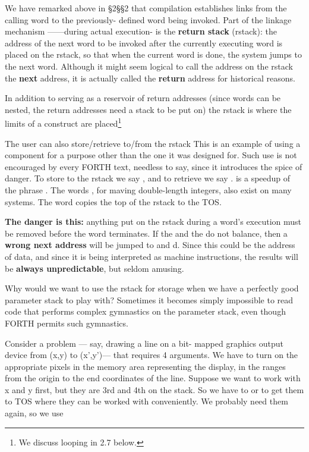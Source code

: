 We have remarked above in §2§§2 that compilation establishes links from the calling word to the previously- defined word being invoked. Part of the linkage mechanism ——during actual execution- is the \textbf{return stack} (rstack): the address of the next word to be invoked after the currently executing word is placed on the rstack, so that when the current word is done, the system jumps to the next word. Although it might seem logical to call the address on the rstack the \textbf{next} address, it is actually called the \textbf{return} address for historical reasons.

In addition to serving as a reservoir of return addresses (since words can be nested, the return addresses need a stack to be put on) the rstack is where the limits of a  construct are placed\footnote{We discuss looping in 2.7 below.}

The user can also store/retrieve to/from the rstack This is an example of using a component for a purpose other than the one it was designed for. Such use is not encouraged by every FORTH text, needless to say, since it introduces the spice of danger. To store to the rstack we say , and to retrieve we say .  is a speedup of the phrase . The words  , for maving double-length integers, also exist on many systems. The word  copies the top of the rstack to the TOS.

\leftbar[1\linewidth]
\textbf{The danger is this:} anything put on the rstack during a word’s execution must be removed before the word terminates. If the  and the  do not balance, then a \textbf{wrong next address} will be jumped to and d. Since this could be the address of data, and since it is being interpreted as machine instructions, the results will be \textbf{always unpredictable}, but seldom amusing.
\endleftbar

Why would we want to use the rstack for storage when we have a perfectly good parameter stack to play with? Sometimes it becomes simply impossible to read code that performs complex gymnastics on the parameter stack, even though FORTH permits such gymnastics.

Consider a problem — say, drawing a line on a bit- mapped graphics output device from (x,y) to (x',y')— that requires 4 arguments. We have to turn on the appropriate pixels in the memory area representing the display, in the ranges from the origin to the end coordinates of the line. Suppose we want to work with x and y first, but they are 3rd and 4th on the stack. So we have to  or  to get them to TOS where they can be worked with conveniently. We probably need them again, so we use

